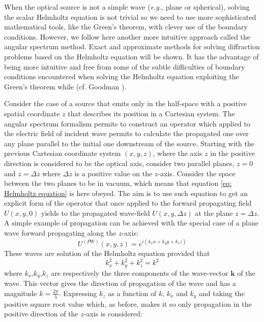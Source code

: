 \documentclass{iucr}              %
\begin{document}
When the optical source is not a simple wave (\emph{e.g.}, plane or spherical), solving the scalar Helmholtz equation is not trivial so we need to use more sophisticated mathematical tools, like the Green's theorem, with clever use of the boundary conditions. However, we follow here another more intuitive approach called the angular spectrum method.  Exact and approximate methods for solving diffraction problems based on the Helmholtz equation will be shown. It has the advantage of being more intuitive and free from some of the subtle difficulties of boundary conditions encountered when solving the Helmholtz equation exploiting the Green's theorem while (cf. Goodman \cite{goodmanfourier}).

Consider the case of a source that emits only in the half-space with a positive spatial coordinate $z$ that describes its position in a Cartesian system.
The angular spectrum formalism permits to construct an operator which applied to the electric field of incident wave permits to calculate the propagated one over any plane parallel to the initial one downstream of the source. Starting with the previous Cartesian coordinate system $(x,y,z)$, where the axis $z$ in the positive direction is considered to be the optical axis, consider two parallel planes, $z=0$ and $z=\Delta z$ where $\Delta z$ is a positive value on the $z$-axis. Consider the space between the two planes to be in vacuum, which means that equation \ref{eq: Helmholtz equation} is here obeyed. The aim is to use such equation to get an explicit form of the operator that once applied to the forward propagating field $U(x,y,0)$ yields to the propagated wave-field $U(x,y,\Delta z)$ at the plane $z=\Delta z$. A simple example of propagation can be achieved with the special case of a plane wave forward propagating along the $z$-axis:
\begin{equation} \label{eq: plane wave}
U^{(PW)}(x,y,z)=e^{i(k_xx+k_yy+k_zz)}
\end{equation}
These waves are solution of the Helmholtz equation provided that
\begin{equation}\label{eq: k definition}
k_x^2+k_y^2+k_z^2 =k^2
\end{equation}
where $k_x$,$k_y$,$k_z$ are respectively the three components of the wave-vector $\bm{k}$ of the wave. This vector gives the direction of propagation of the wave and has a magnitude $k=\frac{2\pi}{\lambda}$. Expressing $k_z$ as a function of $k$, $k_x$ and $k_y$ and taking the positive square root value which, as before, makes it so only propagation in the positive direction of the $z$-axis is considered:
\end{document}
